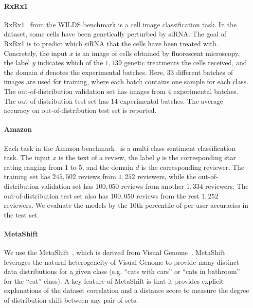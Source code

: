 \paragraph{RxRx1}
RxRx1~\citep{koh2021wilds,taylor2019rxrx1} from the WILDS benchmark is a cell image classification task. In the dataset, some cells have been genetically perturbed by siRNA. The goal of RxRx1 is to predict which siRNA that the cells have been treated with. Concretely, the input $x$ is an image of cells obtained by fluorescent microscopy, the label $y$ indicates which of the $1,139$ genetic treatments the cells received, and the domain $d$ denotes the experimental batches. Here, $33$ different batches of images are used for training, where each batch contains one sample for each class. The out-of-distribution validation set has images from $4$ experimental batches. The out-of-distribution test set has $14$ experimental batches. The average accuracy on out-of-distribution test set is reported.

\paragraph{Amazon}
Each task in the Amazon benchmark~\citep{koh2021wilds,ni2019justifying} is a multi-class sentiment classification task. The input $x$ is the text of a review, the label $y$ is the corresponding star rating ranging from 1 to 5, and the domain $d$ is the corresponding reviewer. The training set has $245,502$ reviews from $1,252$ reviewers, while the out-of-distribution validation set has $100,050$ reviews from another $1,334$ reviewers. The out-of-distribution test set also has $100,050$ reviews from the rest $1,252$ reviewers. We evaluate the models by the 10th percentile of per-user accuracies in the test set.



\paragraph{MetaShift} 
We use the MetaShift~\citep{metadataset}, which is derived from Visual Genome~\citep{krishnavisualgenome}. 
MetaShift leverages the natural heterogeneity of Visual Genome to provide many distinct data distributions for a given class (e.g. “cats with cars” or “cats in bathroom” for the “cat” class). A key feature of MetaShift is that it provides explicit explanations of the dataset correlation and a distance score to measure the degree of distribution shift between any pair of sets.

